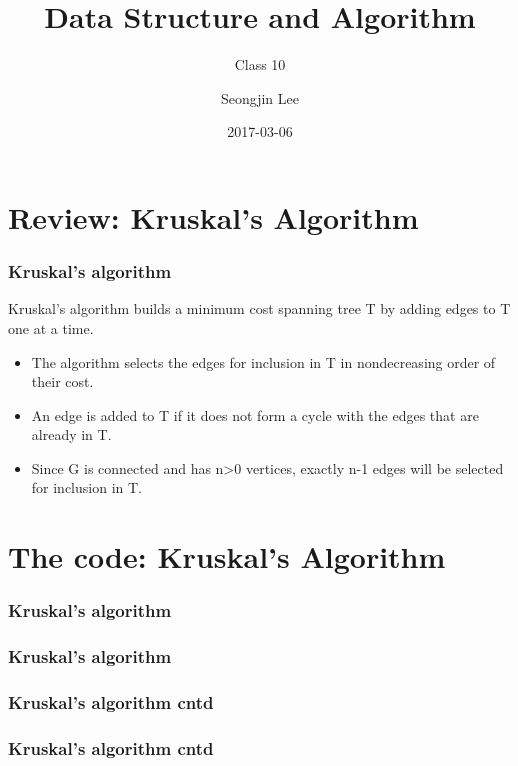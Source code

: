 \documentclass[newPxFont,sthlmFooter,nooffset]{beamer}
\title{Data Structure and Algorithm}
\subtitle{Class 10}
\author[SJL]{Seongjin Lee}
\institute{\href{mailto:insight@gnu.ac.kr}{insight@gnu.ac.kr}\\\url{http://resourceful.github.io}\\Systems Research Lab.\\GNU}
\date{2017-03-06}
\begin{document}
\frame[plain,t]{\titlepage} 



\section{Review: Kruskal's Algorithm}
\begin{frame}[t, fragile]
	\frametitle{Kruskal's algorithm}
	Kruskal's algorithm builds a minimum cost spanning tree T by adding edges to T one at a time.
	\begin{itemize}
		\item The algorithm selects the edges for inclusion in T in nondecreasing order of their cost.
		\item  An edge is added to T if it does not form a cycle with the edges that are already in T.
		\item  Since G is connected and has n>0 vertices, exactly n-1 edges will be selected for inclusion in T.
	\end{itemize} 
\end{frame}

\section{The code: Kruskal's Algorithm}
\begin{frame}[t, fragile]
  \frametitle{Kruskal's algorithm}
  
\end{frame}

\begin{frame}[t, fragile]
  \frametitle{Kruskal's algorithm}
  
\end{frame}


\begin{frame}[t, fragile]
  \frametitle{Kruskal's algorithm cntd}
  
\end{frame}

\begin{frame}[t, fragile]
  \frametitle{Kruskal's algorithm cntd}
  
\end{frame}
\end{document}
